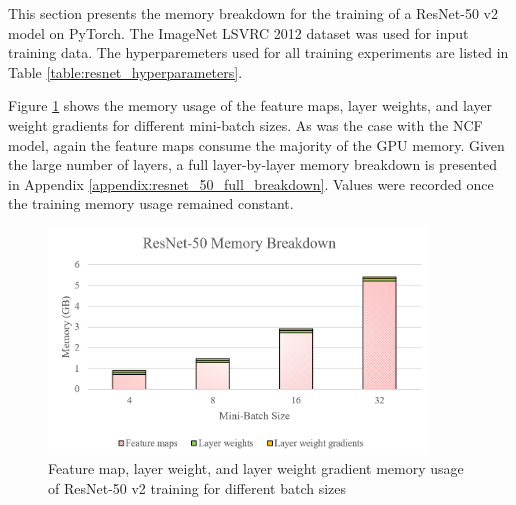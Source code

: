 \documentclass[12pt,letterpaper]{article}
\begin{document}
%
%

This section presents the memory breakdown for the training of a ResNet-50 v2 \cite{resnet} model on PyTorch. The ImageNet LSVRC 2012 dataset \cite{imagenet2012} was used for input training data. The hyperparemeters used for all training experiments are listed in Table \ref{table:resnet_hyperparameters}.

\begin{table}[H]
\centering
{}
\caption{Hyperparameters used for ResNet-50 v2 memory profiling experiments}
\label{table:resnet_hyperparameters}
\end{table}

Figure \ref{fig:resnet_bar_graph} shows the memory usage of the feature maps, layer weights, and layer weight gradients for different mini-batch sizes. As was the case with the NCF model, again the feature maps consume the majority of the GPU memory. Given the large number of layers, a full layer-by-layer memory breakdown is presented in Appendix \ref{appendix:resnet_50_full_breakdown}.  Values were recorded once the training memory usage remained constant.
\begin{figure}[H]
\centering
\includegraphics[width=0.9\textwidth]{resnet_bar_graphs.PNG}
\captionsetup{width=0.8\linewidth}
\caption{Feature map, layer weight, and layer weight gradient memory usage of ResNet-50 v2 training for different batch sizes}
\label{fig:resnet_bar_graph}
\end{figure}
\end{document}
